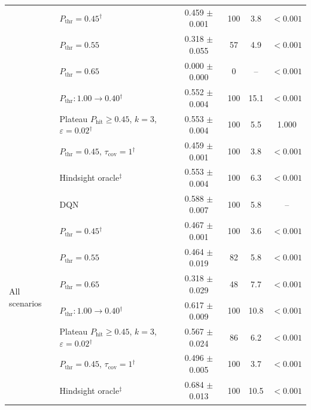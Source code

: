 \begin{table}[htbp]
\begin{tabular}{llcccc}
 & $P_{\mathrm{thr}}=0.45$$^{\dagger}$ & 0.459 $\pm$ 0.001 & 100 & 3.8 & $<0.001$ \\
 & $P_{\mathrm{thr}}=0.55$ & 0.318 $\pm$ 0.055 & 57 & 4.9 & $<0.001$ \\
 & $P_{\mathrm{thr}}=0.65$ & 0.000 $\pm$ 0.000 & 0 & -- & $<0.001$ \\
 & $P_{\mathrm{thr}}: 1.00 \to 0.40$$^{\dagger}$ & 0.552 $\pm$ 0.004 & 100 & 15.1 & $<0.001$ \\
 & Plateau $P_{\mathrm{hit}}\geq0.45$, $k=3$, $\varepsilon=0.02$$^{\dagger}$ & 0.553 $\pm$ 0.004 & 100 & 5.5 & 1.000 \\
 & $P_{\mathrm{thr}}=0.45$, $\tau_{\mathrm{cov}}=1$$^{\dagger}$ & 0.459 $\pm$ 0.001 & 100 & 3.8 & $<0.001$ \\
 & Hindsight oracle$^{\ddagger}$ & 0.553 $\pm$ 0.004 & 100 & 6.3 & $<0.001$ \\
\midrule
\multirow{8}{*}{All scenarios} & DQN & 0.588 $\pm$ 0.007 & 100 & 5.8 & -- \\
 & $P_{\mathrm{thr}}=0.45$$^{\dagger}$ & 0.467 $\pm$ 0.001 & 100 & 3.6 & $<0.001$ \\
 & $P_{\mathrm{thr}}=0.55$ & 0.464 $\pm$ 0.019 & 82 & 5.8 & $<0.001$ \\
 & $P_{\mathrm{thr}}=0.65$ & 0.318 $\pm$ 0.029 & 48 & 7.7 & $<0.001$ \\
 & $P_{\mathrm{thr}}: 1.00 \to 0.40$$^{\dagger}$ & 0.617 $\pm$ 0.009 & 100 & 10.8 & $<0.001$ \\
 & Plateau $P_{\mathrm{hit}}\geq0.45$, $k=3$, $\varepsilon=0.02$$^{\dagger}$ & 0.567 $\pm$ 0.024 & 86 & 6.2 & $<0.001$ \\
 & $P_{\mathrm{thr}}=0.45$, $\tau_{\mathrm{cov}}=1$$^{\dagger}$ & 0.496 $\pm$ 0.005 & 100 & 3.7 & $<0.001$ \\
 & Hindsight oracle$^{\ddagger}$ & 0.684 $\pm$ 0.013 & 100 & 10.5 & $<0.001$ \\
\bottomrule
\end{tabular}
\end{table}
